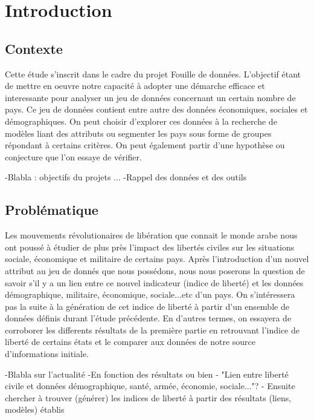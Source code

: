 \section{Introduction}

\subsection{Contexte}
Cette étude s'inscrit dans le cadre du projet Fouille de données. L'objectif étant de mettre en oeuvre notre capacité à adopter une démarche efficace et interessante pour analyser un jeu de données concernant un certain nombre de pays.
Ce jeu de données contient entre autre des données économiques, sociales et démographiques. On peut choisir d'explorer ces données à la recherche de modèles liant des attributs ou segmenter les pays sous forme de groupes répondant à certains critères. On peut également partir d'une hypothèse ou conjecture que l'on essaye de vérifier.  

-Blabla : objectifs du projets ...
-Rappel des données et des outils
\subsection{Problématique}

Les mouvements révolutionaires de libération que connait le monde arabe nous ont poussé à étudier de plus près l'impact des libertés civiles sur les situations sociale, économique et militaire de certains pays.
Après l'introduction d'un nouvel attribut au jeu de donnés que nous possédons, nous nous poserons la question de savoir s'il y a un lien entre ce nouvel indicateur (indice de liberté) et les données démographique, militaire, économique, sociale...etc d'un pays.
On s'intéressera pas la suite à la génération de cet indice de liberté à partir d'un ensemble de données définis durant l'étude précédente. En d'autres termes, on essayera de corroborer les differents résultats de la première partie en retrouvant l'indice de liberté de certains états et le comparer aux données de notre source d'informations initiale.


-Blabla sur l'actualité
-En fonction des résultats ou bien 
- "Lien entre liberté civile et données démographique, santé, armée, économie, sociale..."?
- Ensuite chercher à trouver (générer) les indices de liberté à partir des résultats (liens, modèles) établis

